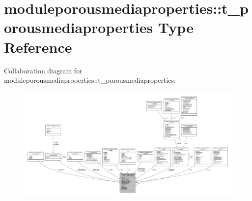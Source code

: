 \hypertarget{structmoduleporousmediaproperties_1_1t__porousmediaproperties}{}\section{moduleporousmediaproperties\+:\+:t\+\_\+porousmediaproperties Type Reference}
\label{structmoduleporousmediaproperties_1_1t__porousmediaproperties}


Collaboration diagram for moduleporousmediaproperties\+:\+:t\+\_\+porousmediaproperties\+:\nopagebreak
\begin{figure}[H]
\begin{center}
\leavevmode
\includegraphics[width=350pt]{structmoduleporousmediaproperties_1_1t__porousmediaproperties__coll__graph}
\end{center}
\end{figure}
